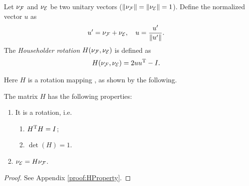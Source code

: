 \documentclass[10pt,twocolumn,twoside]{IEEEtran}
\begin{document}
  \begin{definition} Let $\nu_{\mathcal{F}}$ and $\nu_{\mathcal{E}}$ be two unitary vectors ($\lVert\nu_{\mathcal{F}}\rVert=\lVert\nu_{\mathcal{E}}\rVert=1$).  Define the normalized vector $u$ as
    \begin{equation}
      u'=\nu_{\mathcal{F}}+\nu_{\mathcal{E}},\quad u =\frac{u'}{\lVert u'\rVert}.
    \end{equation}
    The \emph{Householder rotation} $H(\nu_{\mathcal{F}},\nu_{\mathcal{E}})$ is defined as
    \begin{equation}\label{eq:H definition}
      H(\nu_{\mathcal{F}},\nu_{\mathcal{E}}) = 2 u u^\mathrm{T}-I.
    \end{equation}
  \end{definition}
  Here $H$ is a rotation mapping , as shown by the following.
  \begin{proposition}\label{prop:HProperty}
    The matrix $H$ has the following properties:
    \begin{enumerate}
    \item It is a rotation, i.e.
      \begin{enumerate}
      \item\label{it:orthonormality} $H^\mathrm{T} H=I$;
      \item\label{it:determinant} $\det(H)=1$.
      \end{enumerate}
    \item\label{it:transformation} $\nu_{\mathcal{E}}=H \nu_{\mathcal{F}}$.
    \end{enumerate}
  \end{proposition}
  \begin{proof}
  	See Appendix \ref{proof:HProperty}.
  \end{proof}
\end{document}
